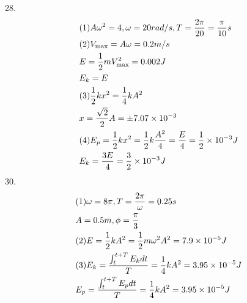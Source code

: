 \documentclass{article}
\begin{document}
28.\[\begin{gathered}
  (1)A{\omega ^2} = 4,\omega  = 20rad/s,T = \frac{{2\pi }}{{20}} = \frac{\pi }{{10}}s \hfill \\
  (2){V_{\max }} = A\omega  = 0.2m/s \hfill \\
  E = \frac{1}{2}mV_{\max }^2 = 0.002J \hfill \\
  {E_k} = E \hfill \\
  (3)\frac{1}{2}k{x^2} = \frac{1}{4}k{A^2} \hfill \\
  x = \frac{{\sqrt 2 }}{2}A =  \pm 7.07 \times {10^{ - 3}} \hfill \\
  (4){E_p} = \frac{1}{2}k{x^2} = \frac{1}{2}k\frac{{{A^2}}}{4} = \frac{E}{4} = \frac{1}{2} \times {10^{ - 3}}J \hfill \\
  {E_k} = \frac{{3E}}{4} = \frac{3}{2} \times {10^{ - 3}}J \hfill \\
\end{gathered} \]
30.\[\begin{gathered}
  (1)\omega  = 8\pi ,T = \frac{{2\pi }}{\omega } = 0.25s \hfill \\
  A = 0.5m,\phi  = \frac{\pi }{3} \hfill \\
  (2)E = \frac{1}{2}k{A^2} = \frac{1}{2}m{\omega ^2}{A^2} = 7.9 \times {10^{ - 5}}J \hfill \\
  (3){E_k} = \frac{{\int_t^{t + T} {{E_k}dt} }}{T} = \frac{1}{4}k{A^2} = 3.95 \times {10^{ - 5}}J \hfill \\
  {E_p} = \frac{{\int_t^{t + T} {{E_p}dt} }}{T} = \frac{1}{4}k{A^2} = 3.95 \times {10^{ - 5}}J \hfill \\
\end{gathered} \]
\end{document}
